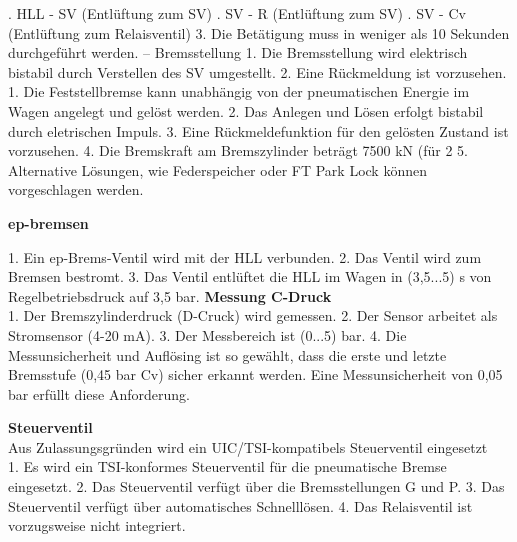 .	HLL - SV (Entlüftung zum SV)
.	SV - R (Entlüftung zum SV)
.	SV - Cv (Entlüftung zum Relaisventil)
3.	Die Betätigung muss in weniger als 10 Sekunden durchgeführt werden.
–	Bremsstellung 1.	Die Bremsstellung wird elektrisch bistabil durch Verstellen des SV umgestellt.
2.	Eine Rückmeldung ist vorzusehen.\\
1.	Die Feststellbremse kann unabhängig von der pneumatischen Energie im Wagen angelegt und gelöst werden.
2.	Das Anlegen und Lösen erfolgt bistabil durch eletrischen Impuls.
3.	Eine Rückmeldefunktion für den gelösten Zustand ist vorzusehen.
4.	Die Bremskraft am Bremszylinder beträgt 7500 kN (für 2%
5.	Alternative Lösungen, wie Federspeicher oder FT Park Lock können vorgeschlagen werden.\par
\textbf{ep-bremsen}\par
1.	Ein ep-Brems-Ventil wird mit der HLL verbunden.
2.	Das Ventil wird zum Bremsen bestromt.
3.	Das Ventil entlüftet die HLL im Wagen in (3,5...5) s von Regelbetriebsdruck auf 3,5 bar.
\textbf{Messung C-Druck}\\
1.	Der Bremszylinderdruck (D-Cruck) wird gemessen.
2.	Der Sensor arbeitet als Stromsensor (4-20 mA).
3.	Der Messbereich ist (0...5) bar.
4.	Die Messunsicherheit und Auflösing ist so gewählt, dass die erste und letzte Bremsstufe (0,45 bar Cv) sicher erkannt werden. Eine Messunsicherheit von 0,05 bar erfüllt diese Anforderung.
\par
\textbf{Steuerventil} \\ Aus Zulassungsgründen wird ein UIC/TSI-kompatibels Steuerventil eingesetzt\\1.	Es wird ein TSI-konformes Steuerventil für die pneumatische Bremse eingesetzt.
2.	Das Steuerventil verfügt über die Bremsstellungen G und P.
3.	Das Steuerventil verfügt über automatisches Schnelllösen.
4.	Das Relaisventil ist vorzugsweise nicht integriert.



